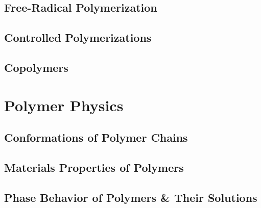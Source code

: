 \documentclass[book]{pogil}
\begin{document}
	\chapter{Free-Radical Polymerization}
		
		
		

	\chapter{Controlled Polymerizations}
		
		
		
		

	\chapter{Copolymers}
		

\part{Polymer Physics}

	\chapter{Conformations of Polymer Chains}
		
		

	\chapter{Materials Properties of Polymers}
		
		
		

	\chapter{Phase Behavior of Polymers \& Their Solutions}
		
		
		
		
\end{document}
